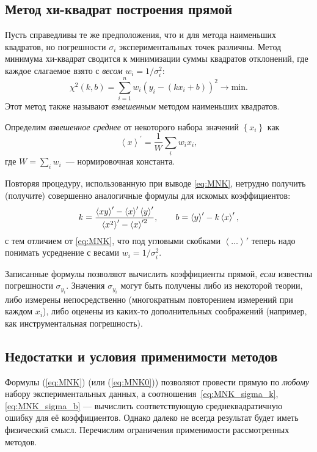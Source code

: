 \subsection{Метод хи-квадрат построения прямой}
\label{sec:linchi2}
Пусть справедливы те же предположения, что и для метода наименьших квадратов,
но погрешности $\sigma_{i}$ экспериментальных точек различны. Метод
минимума хи-квадрат сводится к минимизации суммы квадратов отклонений,
где каждое слагаемое взято с \emph{весом} $w_i = 1/\sigma_i^2$:
 \[
 \chi^2(k,b)=\sum\limits _{i=1}^{n}w_{i} \left(y_i-(kx_i+b)\right)^{2}\to\mathrm{min}.
\]
Этот метод также называют \emph{взвешенным} методом наименьших квадратов.

Определим \emph{взвешенное среднее} от
некоторого набора значений $\left\{x_{i}\right\}$ как
\[
\left\langle x\right\rangle ^{\prime}=\frac{1}{W}\sum_{i}w_{i}x_{i},
\]
где $W=\sum\limits_{i}w_{i}$~--- нормировочная константа.

Повторяя процедуру, использованную при выводе \eqref{eq:MNK}, нетрудно
получить (получите) совершенно аналогичные формулы для искомых коэффициентов:
\begin{equation}
k=\frac{\average{xy}' - \average{x}'\average{y}'}%
    {\average{x^2}' - \average{x}'^2},\qquad
    b=\average{y}' -k \average{x}',\label{eq:MMP}
\end{equation}
с тем отличием от \eqref{eq:MNK}, что под угловыми скобками
$\left\langle \ldots\right\rangle'$
теперь надо понимать усреднение с весами $w_{i}=1/\sigma_{i}^{2}$.

Записанные формулы позволяют вычислить коэффициенты прямой,
\emph{если} известны погрешности $\sigma_{y_{i}}$. Значения $\sigma_{y_{i}}$
могут быть получены либо из некоторой теории, либо измерены непосредственно
(многократным повторением измерений при каждом $x_{i}$), либо оценены из
каких-то дополнительных соображений (например, как инструментальная погрешность).


\subsection{Недостатки и условия применимости методов}\label{sec:MNKdefect}

Формулы (\ref{eq:MNK}) (или (\ref{eq:MNK0})) позволяют провести
прямую по \emph{любому} набору экспериментальных данных, 
а соотношения~\eqref{eq:MNK_sigma_k}, \eqref{eq:MNK_sigma_b} --- вычислить
соответствующую среднеквадратичную ошибку для её коэффициентов. Однако
далеко не всегда результат будет иметь физический смысл. Перечислим
ограничения применимости рассмотренных методов.

